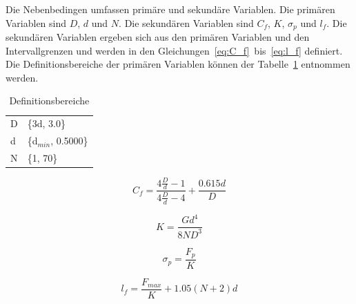 \documentclass[fontsize=12, a4aper]{scrartcl}
\begin{document}
	\noindent Die Nebenbedingen umfassen primäre und sekundäre Variablen. Die primären Variablen sind \(D\), \(d\) und \(N\). Die sekundären Variablen sind \(C_f\), \(K\), \(\sigma_p\) und \(l_f\). Die sekundären Variablen ergeben sich aus den primären Variablen und den Intervallgrenzen und werden in den Gleichungen~\ref{eq:C_f}~bis~\ref{eq:l_f} definiert. Die Definitionsbereiche der primären Variablen können der Tabelle~\ref{table:prim_var_domain} entnommen werden.\\
	
	\begin{table}[H]
		
		\fontsize{10pt}{12pt}
		
		\caption{Definitionsbereiche}
		
		\label{table:prim_var_domain}
		
		\begin{center}
			
			\begin{tabular}{l l}
				
				\hline
				
				D & \{3d, 3.0\}\\
				
				d & \{d\(_{min}\), 0.5000\}\\
				
				N & \{1, 70\}\\
				
				\hline
				
			\end{tabular}
			
		\end{center}
		
	\end{table}
	
	\begin{equation} \label{eq:C_f}
		C_f = \frac{4 \frac{D}{d} - 1}{4 \frac{D}{d} - 4} + \frac{0.615d}{D}
	\end{equation}
	
	\begin{equation} \label{eq:K}
		K = \frac{G d^4}{8 N D^3}
	\end{equation}
	
	\begin{equation} \label{eq:sigma_p}
		\sigma_p = \frac{F_p}{K}
	\end{equation}
	
	\begin{equation} \label{eq:l_f}
		l_f = \frac{F_{max}}{K} + 1.05 (N + 2) d
	\end{equation}\\
	
\end{document}
